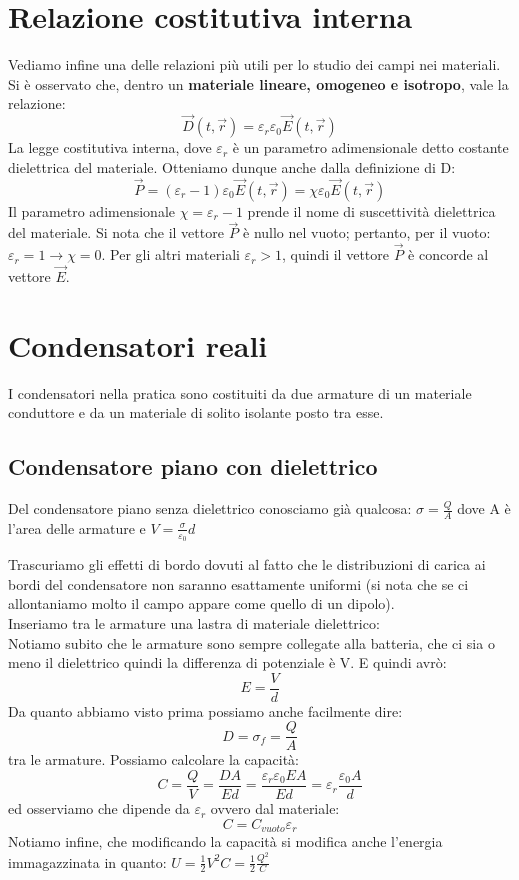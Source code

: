 \documentclass{book}
\begin{document}
\section{Relazione costitutiva interna}
Vediamo infine una delle relazioni più utili per lo studio dei campi nei materiali.
Si è osservato che, dentro un \textbf{materiale lineare, omogeneo e isotropo}, vale la relazione: 
$$
\vec{D}(t,\vec{r}) = \varepsilon_r \varepsilon_0 \vec{E}(t,\vec{r})
$$
La legge costitutiva interna, dove $\varepsilon_r$ è un parametro adimensionale detto costante dielettrica del materiale. 
Otteniamo dunque anche dalla definizione di D: 
$$
\vec{P}= (\varepsilon_r-1)\varepsilon_0\vec{E}(t,\vec{r}) = \chi\varepsilon_0\vec{E}(t,\vec{r})
$$
Il parametro adimensionale $\chi = \varepsilon_r - 1$ prende il nome di suscettività dielettrica del materiale.
Si nota che il vettore $\vec{P}$ è nullo nel vuoto; pertanto, per il vuoto: $ \varepsilon_r = 1 \to \chi = 0 $.
Per gli altri materiali $\varepsilon_r > 1$, quindi il vettore $\vec{P}$ è concorde al vettore $\vec{E}$.
\section{Condensatori reali}

I condensatori nella pratica sono costituiti da due armature di un materiale conduttore e da un materiale di solito isolante posto tra esse. 


\subsection{Condensatore piano con dielettrico}

Del condensatore piano senza dielettrico conosciamo già qualcosa:
 $\sigma = \frac{Q}{A}$ dove A è l'area delle armature e $V=\frac{\sigma}{\varepsilon_0}d$

Trascuriamo gli effetti di bordo dovuti al fatto che le distribuzioni di carica ai bordi del condensatore non saranno esattamente uniformi
(si nota che se ci allontaniamo molto il campo appare come quello di un dipolo).
\\
Inseriamo tra le armature una lastra di materiale dielettrico:
\\
Notiamo subito che le armature sono sempre collegate alla batteria, che ci sia o meno il dielettrico quindi la differenza di potenziale è V. E quindi avrò:
$$
E = \frac{V}{d}
$$
Da quanto abbiamo visto prima possiamo anche facilmente dire: 
$$
D=\sigma_f=\frac{Q}{A}
$$
tra le armature.
Possiamo calcolare la capacità: 
$$
C = \frac{Q}{V} = \frac{DA}{E d} = \frac{\varepsilon_r\varepsilon_0EA}{Ed} = \varepsilon_r \frac{\varepsilon_0A}{d}
$$
ed osserviamo che dipende da $\varepsilon_r$ ovvero dal materiale: 
$$
C= C_{vuoto}\varepsilon_r
$$
Notiamo infine, che modificando la capacità si modifica anche l'energia immagazzinata in quanto: $U=\frac{1}{2}V^2C=\frac{1}{2}\frac{Q^2}{C}$
\end{document}
